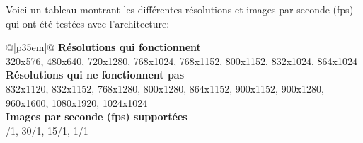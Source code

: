 \vspace{\baselineskip}
\noindent Voici un tableau montrant les différentes résolutions et images par seconde (\acrshort{fps}) qui ont été testées avec l'architecture:
{
    \renewcommand*{\arraystretch}{1.4}
    \begin{table}[ht]
    \centering
    \caption{Résolutions et images par seconde (\acrshort{fps}) testés}\label{table:resolutions_tested}
    \vspace{0.1em} %
    \begin{tabular}{{@{}|p{35em}|@{}}}
         \hline
         \textbf{Résolutions qui fonctionnent}\\
         \hline
        320x576, 480x640, 720x1280, 768x1024, 768x1152, 800x1152, 832x1024, 864x1024\\
        \hline
        \textbf{Résolutions qui ne fonctionnent pas}\\
        \hline
        832x1120, 832x1152, 768x1280, 800x1280, 864x1152, 900x1152, 900x1280, 960x1600, 1080x1920, 1024x1024\\
        \hline
        \textbf{Images par seconde (\acrshort{fps}) supportées}\\
        /1, 30/1, 15/1, 1/1\\
        \hline
    \end{tabular}
    \end{table}
}
